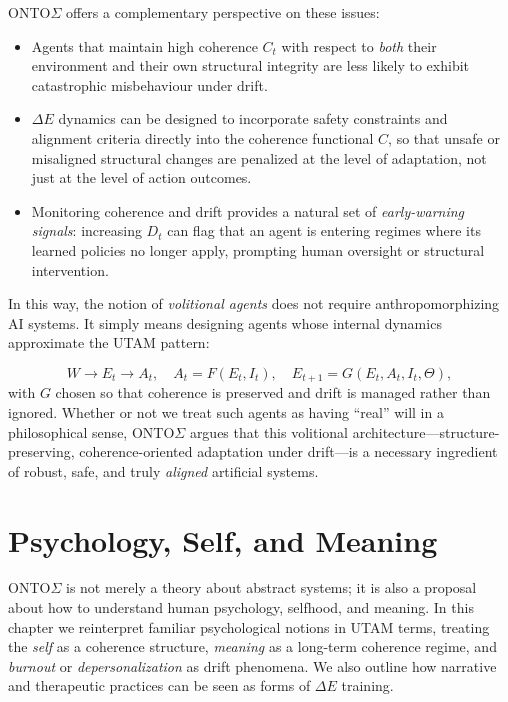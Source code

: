 \documentclass[12pt,a4paper]{report}
\newcommand{\Will}{W}
\begin{document}
ONTO$\Sigma$ offers a complementary perspective on these issues:

\begin{itemize}[leftmargin=2em]
    \item Agents that maintain high coherence \(C_t\) with respect to \emph{both} their environment and their own structural integrity are less likely to exhibit catastrophic misbehaviour under drift.
    \item $\Delta E$ dynamics can be designed to incorporate safety constraints and alignment criteria directly into the coherence functional \(C\), so that unsafe or misaligned structural changes are penalized at the level of adaptation, not just at the level of action outcomes.
    \item Monitoring coherence and drift provides a natural set of \emph{early-warning signals}: increasing \(D_t\) can flag that an agent is entering regimes where its learned policies no longer apply, prompting human oversight or structural intervention.
\end{itemize}

In this way, the notion of \emph{volitional agents} does not require anthropomorphizing AI systems. It simply means designing agents whose internal dynamics approximate the UTAM pattern:

\[
    \Will \to E_t \to A_t, \quad
    A_t = F(E_t, I_t), \quad
    E_{t+1} = G(E_t, A_t, I_t, \Theta),
\]
with \(G\) chosen so that coherence is preserved and drift is managed rather than ignored. Whether or not we treat such agents as having ``real'' will in a philosophical sense, ONTO$\Sigma$ argues that this volitional architecture---structure-preserving, coherence-oriented adaptation under drift—is a necessary ingredient of robust, safe, and truly \emph{aligned} artificial systems.


\chapter{Psychology, Self, and Meaning}

ONTO$\Sigma$ is not merely a theory about abstract systems; it is also a proposal about how to understand human psychology, selfhood, and meaning. In this chapter we reinterpret familiar psychological notions in UTAM terms, treating the \emph{self} as a coherence structure, \emph{meaning} as a long-term coherence regime, and \emph{burnout} or \emph{depersonalization} as drift phenomena. We also outline how narrative and therapeutic practices can be seen as forms of $\Delta E$ training.
\end{document}
